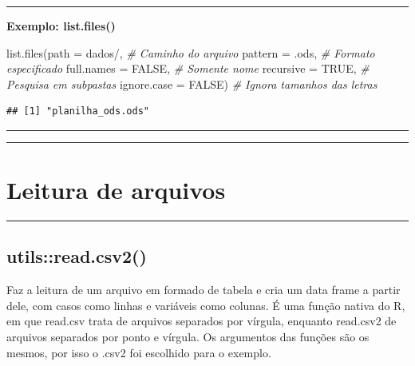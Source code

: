 \documentclass[
]{book}
\newenvironment{Shaded}{\begin{snugshade}}{\end{snugshade}}
\newcommand{\AttributeTok}[1]{\textcolor[rgb]{0.77,0.63,0.00}{#1}}
\newcommand{\CommentTok}[1]{\textcolor[rgb]{0.56,0.35,0.01}{\textit{#1}}}
\newcommand{\ConstantTok}[1]{\textcolor[rgb]{0.00,0.00,0.00}{#1}}
\newcommand{\FunctionTok}[1]{\textcolor[rgb]{0.00,0.00,0.00}{#1}}
\newcommand{\NormalTok}[1]{#1}
\newcommand{\StringTok}[1]{\textcolor[rgb]{0.31,0.60,0.02}{#1}}
\theoremstyle{definition}
\theoremstyle{definition}
\theoremstyle{definition}
\theoremstyle{definition}
\theoremstyle{remark}
\begin{document}
\begin{center}\rule{0.5\linewidth}{0.5pt}\end{center}

\textbf{Exemplo: list.files()}

\begin{Shaded}
\begin{Highlighting}[]
\FunctionTok{list.files}\NormalTok{(}\AttributeTok{path =} \StringTok{\textquotesingle{}dados/\textquotesingle{}}\NormalTok{,      }\CommentTok{\# Caminho do arquivo}
           \AttributeTok{pattern =} \StringTok{\textquotesingle{}.ods\textquotesingle{}}\NormalTok{,     }\CommentTok{\# Formato especificado}
           \AttributeTok{full.names =} \ConstantTok{FALSE}\NormalTok{,   }\CommentTok{\# Somente nome}
           \AttributeTok{recursive =} \ConstantTok{TRUE}\NormalTok{,     }\CommentTok{\# Pesquisa em subpastas}
           \AttributeTok{ignore.case =} \ConstantTok{FALSE}\NormalTok{)  }\CommentTok{\# Ignora tamanhos das letras}
\end{Highlighting}
\end{Shaded}

\begin{verbatim}
## [1] "planilha_ods.ods"
\end{verbatim}

\begin{center}\rule{0.5\linewidth}{0.5pt}\end{center}

\begin{center}\rule{0.5\linewidth}{0.5pt}\end{center}

\hypertarget{leitura-de-arquivos}{%
\section{Leitura de arquivos}\label{leitura-de-arquivos}}

\begin{center}\rule{0.5\linewidth}{0.5pt}\end{center}

\hypertarget{utilsread.csv2}{%
\subsection{utils::read.csv2()}\label{utilsread.csv2}}

Faz a leitura de um arquivo em formado de tabela e cria um data frame a partir dele, com casos como linhas e variáveis como colunas. É uma função nativa do R, em que read.csv trata de arquivos separados por vírgula, enquanto read.csv2 de arquivos separados por ponto e vírgula. Os argumentos das funções são os mesmos, por isso o .csv2 foi escolhido para o exemplo.
\end{document}
